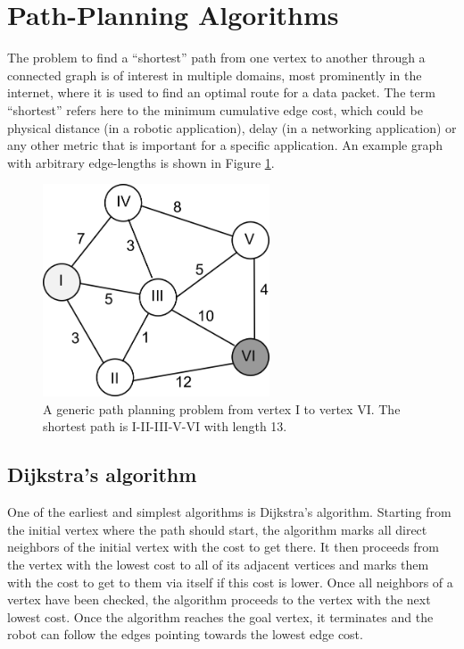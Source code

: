 \section{Path-Planning Algorithms}
The problem to find a ``shortest'' path from one vertex to another through a connected graph is of interest in multiple domains, most prominently in the internet, where it is used to find an optimal route for a data packet. The term ``shortest'' refers here to the minimum cumulative edge cost, which could be physical distance (in a robotic application), delay (in a networking application) or any other metric that is important for a specific application. An example graph with arbitrary edge-lengths is shown in Figure \ref{fig:pathproblem}. 

\begin{figure}[htb]
\centering
\includegraphics[width=0.6\textwidth]{figs/dijkstra}
\caption{A generic path planning problem from vertex I to vertex VI. The shortest path is I-II-III-V-VI with length 13. \label{fig:pathproblem}}
\end{figure}

\subsection{Dijkstra's algorithm}
One of the earliest and simplest algorithms is Dijkstra's algorithm. Starting from the initial vertex where the path should start, the algorithm marks all direct neighbors of the initial vertex with the cost to get there. It then proceeds from the vertex with the lowest cost to all of its adjacent vertices and marks them with the cost to get to them via itself if this cost is lower. Once all neighbors of a vertex have been checked, the algorithm proceeds to the vertex with the next lowest cost. Once the algorithm reaches the goal vertex, it terminates and the robot can follow the edges pointing towards the lowest edge cost.

